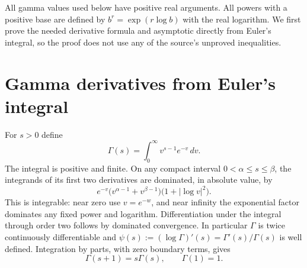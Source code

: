 \documentclass[11pt]{article}
\begin{document}
All gamma values used below have positive real arguments. All powers
with a positive base are defined by $b^r=\exp(r\log b)$ with the real
logarithm. We first prove the needed derivative formula and asymptotic
directly from Euler's integral, so the proof does not use any of the
source's unproved inequalities.

\section{Gamma derivatives from Euler's integral}\label{agamma:sec:derivatives}
For $s>0$ define
\begin{equation}\label{agamma:eq:euler}
\Gamma(s)=\int_0^\infty v^{s-1}e^{-v}\,dv.
\end{equation}
The integral is positive and finite. On any compact interval
$0<\alpha\le s\le\beta$, the integrands of its first two derivatives
are dominated, in absolute value, by
\[
e^{-v}\bigl(v^{\alpha-1}+v^{\beta-1}\bigr)
\bigl(1+|\log v|^2\bigr).
\]
This is integrable: near zero use $v=e^{-w}$, and near infinity the
exponential factor dominates any fixed power and logarithm.
Differentiation under the integral through order two follows by
dominated convergence. In particular $\Gamma$ is twice continuously
differentiable and
$\psi(s):=(\log\Gamma)'(s)=\Gamma'(s)/\Gamma(s)$ is well defined.
Integration by parts, with zero boundary terms, gives
\begin{equation}\label{agamma:eq:recurrence}
\Gamma(s+1)=s\Gamma(s),\qquad \Gamma(1)=1.
\end{equation}
\end{document}
